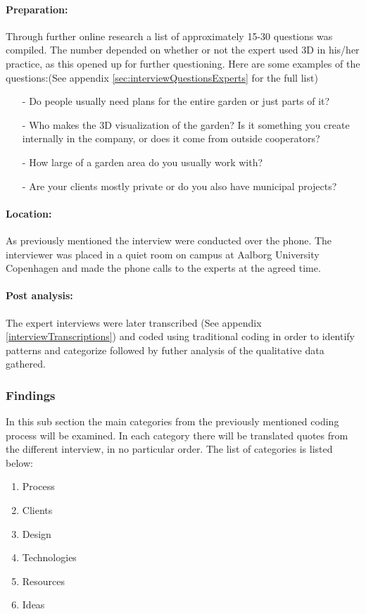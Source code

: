 		\paragraph*{Preparation:}
		Through further online research a list of approximately 15-30 questions was compiled. The number depended on whether or not the expert used 3D in his/her practice, as this opened up for further questioning. Here are some examples of the questions:(See appendix \ref{sec:interviewQuestionsExperts} for the full list)

		\begin{itemize}
			\item[-] Do people usually need plans for the entire garden or just parts of it?
			\item[-] Who makes the 3D visualization of the garden? Is it something you create internally in the company, or does it come from outside cooperators? 
			\item[-] How large of a garden area do you usually work with?
			\item[-] Are your clients mostly private or do you also have municipal projects?
		\end{itemize}
		
		\paragraph*{Location:}As previously mentioned the interview were conducted over the phone. The interviewer was placed in a quiet room on campus at Aalborg University Copenhagen and made the phone calls to the experts at the agreed time.

		\paragraph*{Post analysis:}The expert interviews were later transcribed (See appendix \ref{interviewTranscriptions}) and coded using traditional coding in order to identify patterns and categorize followed by futher analysis of the qualitative data gathered.
		
		\subsubsection{Findings}
		In this sub section the main categories from the previously mentioned coding process will be examined. In each category there will be translated quotes from the different interview, in no particular order. The list of categories is listed below:
		\begin{enumerate}
			\item Process
			\item Clients
			\item Design
			\item Technologies
			\item Resources
			\item Ideas
		\end{enumerate}
	
